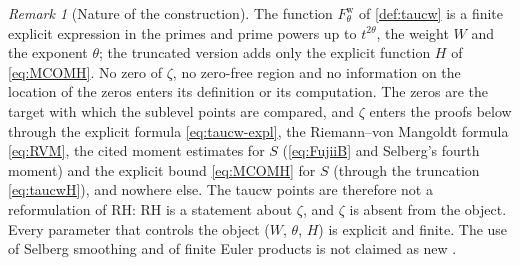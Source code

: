 \documentclass[11pt,a4paper]{article}
\numberwithin{equation}{section}
\theoremstyle{definition}
\theoremstyle{remark}
\newtheorem{remark}[theorem]{Remark}
\begin{document}
\begin{remark}[Nature of the construction]\label{rem:taucw-nature}
The function $F^{\mathrm w}_\theta$ of \cref{def:taucw} is a finite explicit expression in the primes and prime powers up to $t^{2\theta}$, the weight $W$ and the exponent $\theta$; the truncated version adds only the explicit function $H$ of \eqref{eq:MCOMH}. No zero of $\zeta$, no zero-free region and no information on the location of the zeros enters its definition or its computation. The zeros are the target with which the sublevel points are compared, and $\zeta$ enters the proofs below through the explicit formula \eqref{eq:taucw-expl}, the Riemann--von Mangoldt formula \eqref{eq:RVM}, the cited moment estimates for $S$ (\eqref{eq:FujiiB} and Selberg's fourth moment) and the explicit bound \eqref{eq:MCOMH} for $S$ (through the truncation \eqref{eq:taucwH}), and nowhere else. The taucw points are therefore not a reformulation of RH: RH is a statement about $\zeta$, and $\zeta$ is absent from the object. Every parameter that controls the object ($W$, $\theta$, $H$) is explicit and finite. The use of Selberg smoothing and of finite Euler products is not claimed as new \cite{Gonek2012}.
\end{remark}
\end{document}
